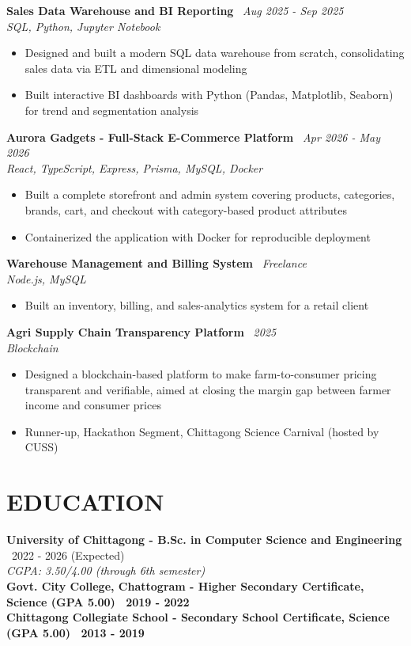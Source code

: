 \documentclass[10.5pt,a4paper]{article}
\newenvironment{tightitemize}{
  \begin{itemize}[leftmargin=15pt, itemsep=1pt, parsep=0pt, topsep=2pt]
}{
  \end{itemize}
}
\newcommand{\entry}[3]{%
  \textbf{#1} \textbar\ #2\\
  \textit{#3}%
}
\newcommand{\entrysimple}[2]{%
  \textbf{#1} \textbar\ \textit{#2}\\[1pt]
}
\newcommand{\entrybold}[2]{%
  \textbf{#1 \textbar\ #2}%
}
\begin{document}
\entrysimple{Sales Data Warehouse and BI Reporting}{Aug 2025 - Sep 2025}
\textit{SQL, Python, Jupyter Notebook}
\begin{tightitemize}
  \item Designed and built a modern SQL data warehouse from scratch, consolidating sales data via ETL and dimensional modeling
  \item Built interactive BI dashboards with Python (Pandas, Matplotlib, Seaborn) for trend and segmentation analysis
\end{tightitemize}

\entrysimple{Aurora Gadgets - Full-Stack E-Commerce Platform}{Apr 2026 - May 2026}
\textit{React, TypeScript, Express, Prisma, MySQL, Docker}
\begin{tightitemize}
  \item Built a complete storefront and admin system covering products, categories, brands, cart, and checkout with category-based product attributes
  \item Containerized the application with Docker for reproducible deployment
\end{tightitemize}

\entrysimple{Warehouse Management and Billing System}{Freelance}
\textit{Node.js, MySQL}
\begin{tightitemize}
  \item Built an inventory, billing, and sales-analytics system for a retail client
\end{tightitemize}

\entrysimple{Agri Supply Chain Transparency Platform}{2025}
\textit{Blockchain}
\begin{tightitemize}
  \item Designed a blockchain-based platform to make farm-to-consumer pricing transparent and verifiable, aimed at closing the margin gap between farmer income and consumer prices
  \item Runner-up, Hackathon Segment, Chittagong Science Carnival (hosted by CUSS)
\end{tightitemize}

\section*{EDUCATION}
\entry{University of Chittagong - B.Sc. in Computer Science and Engineering}{2022 - 2026 (Expected)}{CGPA: 3.50/4.00 (through 6th semester)}\\[4pt]
\entrybold{Govt. City College, Chattogram - Higher Secondary Certificate, Science (GPA 5.00)}{2019 - 2022}\\[2pt]
\entrybold{Chittagong Collegiate School - Secondary School Certificate, Science (GPA 5.00)}{2013 - 2019}
\end{document}
